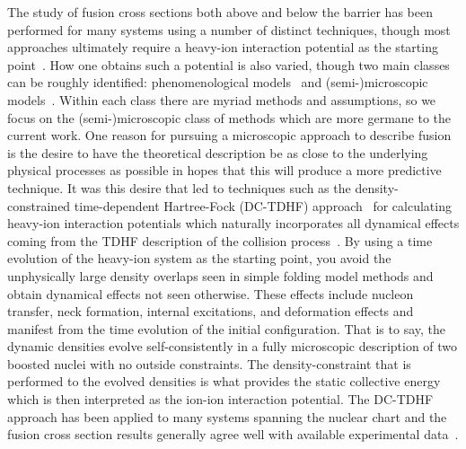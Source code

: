 \documentclass[aps,prc,twocolumn,showpacs,superscriptaddress,longbibliography,floatfix,10pt]{revtex4-1}
\begin{document}
The study of fusion cross sections both above and below the barrier has been performed for many systems using a number of distinct techniques, though most approaches ultimately require a heavy-ion interaction potential as the starting point~\cite{back2014}.
How one obtains such a potential is also varied, though two main classes can be roughly identified: phenomenological models~\cite{bass1974,randrup1978a,satchler1979,rhoadesbrown1983a,seiwert1984,adamian1996b,chamon2002,adamian2004,wang2012,zhu2016,bao2016,feng2017} and (semi-)microscopic models~\cite{brueckner1968,diaz-torres1999,diaz-torres2001b,moller2004,guo2004,guo2005,misicu2006,umar2006b,misicu2007,guo2007b,diaz-torres2007a,lu2014,simenel2017,diaz-torres2018}.
Within each class there are myriad methods and assumptions, so we focus on the (semi-)microscopic class of methods which are more germane to the current work.
One reason for pursuing a microscopic approach to describe fusion is the desire to have the theoretical description be as close to the underlying physical processes as possible in hopes that this will produce a more predictive technique.
It was this desire that led to techniques such as the density-constrained time-dependent Hartree-Fock (DC-TDHF) approach~\cite{umar2006b} for calculating heavy-ion interaction potentials which naturally incorporates all dynamical effects coming from the TDHF description of the collision process~\cite{simenel2018}.
By using a time evolution of the heavy-ion system as the starting point, you avoid the unphysically large density overlaps seen in simple folding model methods and obtain dynamical effects not seen otherwise.
These effects include nucleon transfer, neck formation, internal excitations, and deformation effects and manifest from the time evolution of the initial configuration.
That is to say, the dynamic densities evolve self-consistently in a fully microscopic description of two boosted nuclei with no outside constraints.
The density-constraint that is performed to the evolved densities is what provides the static collective energy which is then interpreted as the ion-ion interaction potential.
The DC-TDHF approach has been applied to many systems spanning the nuclear chart and the fusion cross section results generally agree well with available experimental data~\cite{umar2006a,umar2006d,umar2008b,umar2008a,umar2009b,umar2010c,oberacker2010,keser2012,umar2012a,umar2014a,godbey2017,godbey2019b}.
\end{document}
